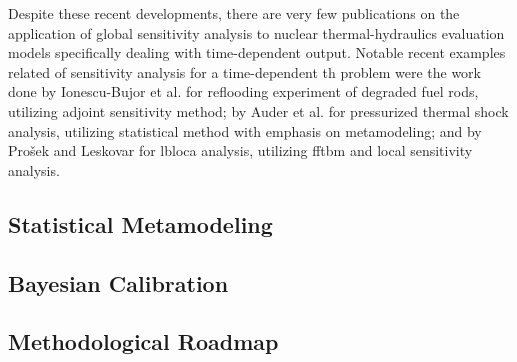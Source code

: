 Despite these recent developments, 
there are very few publications on the application of global sensitivity analysis to nuclear thermal-hydraulics evaluation models specifically dealing with time-dependent output.
Notable recent examples related of sensitivity analysis for a time-dependent \gls{th} problem were the work done by Ionescu-Bujor et al. \cite{Ionescu-Bujor2005} 
for reflooding experiment of degraded fuel rods, utilizing adjoint sensitivity method; 
by Auder et al. \cite{Auder2012} for pressurized thermal shock analysis, 
utilizing statistical method with emphasis on metamodeling; 
and by Prošek and Leskovar \cite{Prosek2015} for \gls{lbloca} analysis, 
utilizing \gls{fftbm} and local sensitivity analysis.

\subsection{Statistical Metamodeling}

\subsection{Bayesian Calibration}

\subsection{Methodological Roadmap}